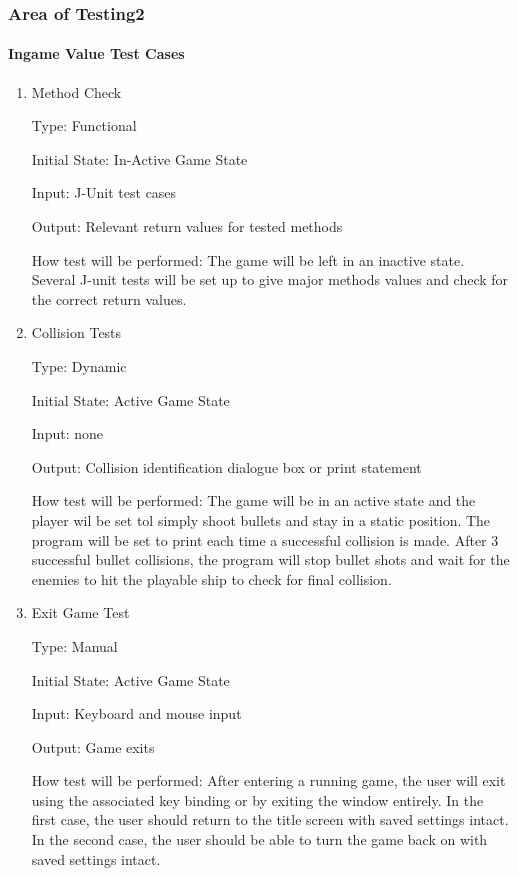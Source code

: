 \documentclass[12pt, titlepage]{article}
\begin{document}
\subsubsection{Area of Testing2}

\paragraph{Ingame Value Test Cases}

\begin{enumerate}

\item{Method Check\\}

Type: Functional

Initial State: In-Active Game State 

Input: J-Unit test cases

Output: Relevant return values for tested methods 

How test will be performed: The game will be left in an inactive state. Several J-unit tests will be set up to give major methods values and check for the correct return values.

\item{Collision Tests\\}

Type: Dynamic

Initial State: Active Game State 

Input: none

Output: Collision identification dialogue box or print statement 

How test will be performed: The game will be in an active state and the player wil be set tol simply shoot bullets and stay in a static position. The program will be set to print each time a successful collision is made. After 3 successful bullet collisions, the program will stop bullet shots and wait for the enemies to hit the playable ship to check for final collision. 

\item{Exit Game Test\\}

Type: Manual

Initial State: Active Game State 

Input: Keyboard and mouse input

Output: Game exits 

How test will be performed: After entering a running game, the user will exit using the associated key binding or by exiting the window entirely. In the first case, the user should return to the title screen with saved settings intact. In the second case, the user should be able to turn the game back on with saved settings intact. 


\end{enumerate}
\end{document}

